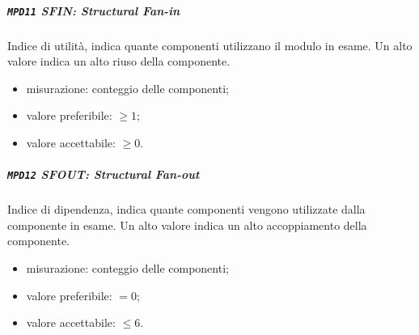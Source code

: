			\subparagraph{\texttt{MPD11} SFIN: Structural Fan-in}
			Indice di utilità, indica quante componenti utilizzano il modulo in esame. Un alto valore indica un alto riuso della componente.
			\begin{itemize}
				\item misurazione: conteggio delle componenti;
				\item valore preferibile: $ \geq 1$;
				\item valore accettabile: $ \geq 0$.
			\end{itemize}
			
			\subparagraph{\texttt{MPD12} SFOUT: Structural Fan-out}
			Indice di dipendenza, indica quante componenti vengono utilizzate dalla componente in esame. Un alto valore indica un alto accoppiamento della componente.
			\begin{itemize}
				\item misurazione: conteggio delle componenti;
				\item valore preferibile: $ = 0$;
				\item valore accettabile: $ \leq 6$.
			\end{itemize}
\pagebreak
